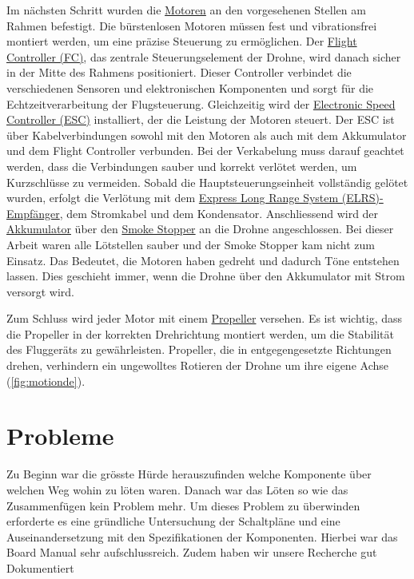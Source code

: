 Im nächsten Schritt wurden die \hyperref[sec:Motoren]{Motoren} an den vorgesehenen Stellen am Rahmen befestigt. Die bürstenlosen Motoren müssen fest und vibrationsfrei montiert werden, um eine präzise Steuerung zu ermöglichen. 
Der \hyperref[sec:F7V3]{Flight Controller (FC)}, das zentrale Steuerungselement der Drohne, wird danach sicher in der Mitte des Rahmens positioniert. Dieser Controller verbindet die verschiedenen Sensoren und elektronischen Komponenten und sorgt für die Echtzeitverarbeitung der Flugsteuerung. Gleichzeitig wird der \hyperref[sec:F7V3]{Electronic Speed Controller (ESC)} installiert, der die Leistung der Motoren steuert. Der ESC ist über Kabelverbindungen sowohl mit den Motoren als auch mit dem Akkumulator und dem Flight Controller verbunden. Bei der Verkabelung muss darauf geachtet werden, dass die Verbindungen sauber und korrekt verlötet werden, um Kurzschlüsse zu vermeiden. 
Sobald die Hauptsteuerungseinheit vollständig gelötet wurden, erfolgt die Verlötung mit dem \hyperref[sec:ELRS-Empfänger]{Express Long Range System (ELRS)-Empfänger}, dem Stromkabel und dem Kondensator.
Anschliessend wird der \hyperref[sec:Akku]{Akkumulator} über den \hyperref[sec:Smoke Stopper]{ Smoke Stopper} an die Drohne angeschlossen. 
Bei dieser Arbeit waren alle Lötstellen sauber und der Smoke Stopper kam nicht zum Einsatz. Das Bedeutet, die Motoren haben gedreht und dadurch Töne entstehen lassen. Dies geschieht immer, wenn die Drohne über den Akkumulator mit Strom versorgt wird.

Zum Schluss wird jeder Motor mit einem \hyperref[sec:Propeller]{Propeller}  versehen. Es ist wichtig, dass die Propeller in der korrekten Drehrichtung montiert werden, um die Stabilität des Fluggeräts zu gewährleisten. Propeller, die in entgegengesetzte Richtungen drehen, verhindern ein ungewolltes Rotieren der Drohne um ihre eigene Achse (\autoref{fig:motionde}).

\section{Probleme}
Zu Beginn war die grösste Hürde herauszufinden welche Komponente über welchen Weg wohin zu löten waren. Danach war das Löten so wie das Zusammenfügen kein Problem mehr. Um dieses Problem zu überwinden erforderte es eine gründliche Untersuchung der Schaltpläne und eine Auseinandersetzung mit den Spezifikationen der Komponenten. Hierbei war das Board Manual\cite{BoardManual} sehr aufschlussreich. Zudem haben wir unsere Recherche gut Dokumentiert

